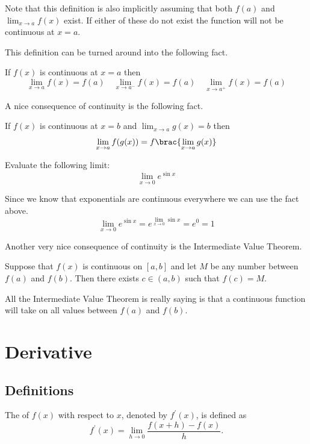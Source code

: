 Note that this definition is also implicitly assuming that both $f(a)$ and $\lim_{x\to a}f(x)$ exist. If either of these do not exist the function will not be continuous at $x=a$.

This definition can be turned around into the following fact.
\begin{corollary}
If $f(x)$ is continuous at $x=a$ then
\[ \lim_{x \to a} f(x) = f(a) \quad \lim_{x \to a^-} f(x) = f(a) \quad \lim_{x \to a^+} f(x) = f(a) \]
\end{corollary}

A nice consequence of continuity is the following fact.
\begin{corollary}
If $f(x)$ is continuous at $x=b$ and $\lim_{x\to a}g(x)=b$ then
\[ \lim_{x \to a} f(g(x)) = f\brac{\lim_{x \to a} g(x)} \]
\end{corollary}

\begin{exercise}
Evaluate the following limit:
\[ \lim_{x \to 0} e^{\sin x} \]
\end{exercise}

\begin{solution}
Since we know that exponentials are continuous everywhere we can use the fact above.
\[ \lim_{x \to 0} e^{\sin x} = e^{\lim_{x \to 0} \sin x} = e^0 = \boxed{1} \]
\end{solution}

Another very nice consequence of continuity is the Intermediate Value Theorem.
\begin{theorem}
Suppose that $f(x)$ is continuous on $[a,b]$ and let $M$ be any number between $f(a)$ and $f(b)$. Then there exists $c \in (a,b)$ such that $f(c)=M$.
\end{theorem}
All the Intermediate Value Theorem is really saying is that a continuous function will take on all values between $f(a)$ and $f(b)$.
\pagebreak

\chapter{Derivative}
\section{Definitions}
\begin{definition}
The  of $f(x)$ with respect to $x$, denoted by $f^\prime(x)$, is defined as 
\begin{equation} f^\prime (x) = \lim_{h \to 0} \frac{f(x+h)-f(x)}{h}.
\end{equation}
\end{definition}

